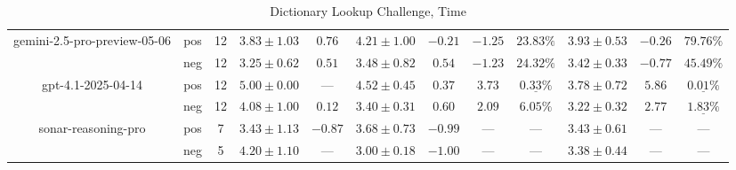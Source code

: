 \begin{table}[ht!]
{\begin{tabular}{| c || c | c || c | c || c | c | c | c || c | c | c ||}
      gemini-2.5-pro-preview-05-06
        & pos
        & 12
        & $3.83 \pm 1.03$
        & $0.76$
        & $4.21 \pm 1.00$
        & $-0.21$
        & $-1.25$
        & $23.83\text{\%}$
        & $3.93 \pm 0.53$
        & $-0.26$
        & $79.76\text{\%}$ \\
        & neg
        & 12
        & $3.25 \pm 0.62$
        & $0.51$
        & $3.48 \pm 0.82$
        & $0.54$
        & $-1.23$
        & $24.32\text{\%}$
        & $3.42 \pm 0.33$
        & $-0.77$
        & $45.49\text{\%}$ \\
    \hline


      gpt-4.1-2025-04-14
        & pos
        & 12
        & $5.00 \pm 0.00$
        & $\text{---}$
        & $4.52 \pm 0.45$
        & $0.37$
        & $3.73$
        & $\underline{\mathbf{0.33\%}}$
        & $3.78 \pm 0.72$
        & $5.86$
        & $\underline{\mathbf{0.01\%}}$ \\
        & neg
        & 12
        & $4.08 \pm 1.00$
        & $0.12$
        & $3.40 \pm 0.31$
        & $0.60$
        & $2.09$
        & $6.05\text{\%}$
        & $3.22 \pm 0.32$
        & $2.77$
        & $\underline{\mathbf{1.83\%}}$ \\
    \hline


      sonar-reasoning-pro
        & pos
        & 7
        & $3.43 \pm 1.13$
        & $-0.87$
        & $3.68 \pm 0.73$
        & $-0.99$
        & $\text{---}$
        & $\text{---}$
        & $3.43 \pm 0.61$
        & $\text{---}$
        & $\text{---}$ \\
        & neg
        & 5
        & $4.20 \pm 1.10$
        & $\text{---}$
        & $3.00 \pm 0.18$
        & $-1.00$
        & $\text{---}$
        & $\text{---}$
        & $3.38 \pm 0.44$
        & $\text{---}$
        & $\text{---}$ \\
    \hline


      \hline
    \end{tabular}
  }
  \caption{Dictionary Lookup Challenge, Time}
  \label{tbleval-dictionary-time_score}
\end{table}


